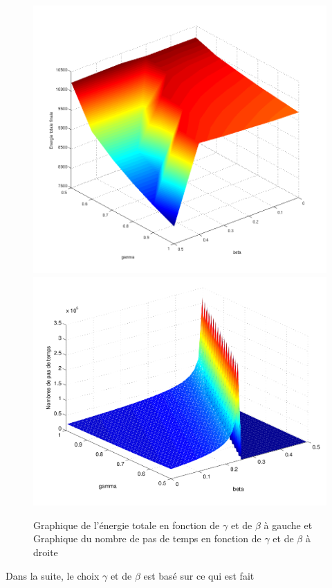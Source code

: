 \documentclass[]{article}
\begin{document}
\begin{figure}
\begin{center}
 \includegraphics[scale=0.28]{Figures/energie.png}
\includegraphics[scale=0.22]{Figures/pasdetemps.png}
\caption{Graphique de l'énergie totale en fonction de $\gamma$ et de $\beta$ à
gauche et Graphique du nombre de pas de temps en fonction de $\gamma$ et de
$\beta$ à droite}
\label{choixpara}
\end{center}
\end{figure}
Dans la suite, le choix $\gamma$ et de $\beta$ est basé sur ce qui est fait
\end{document}
